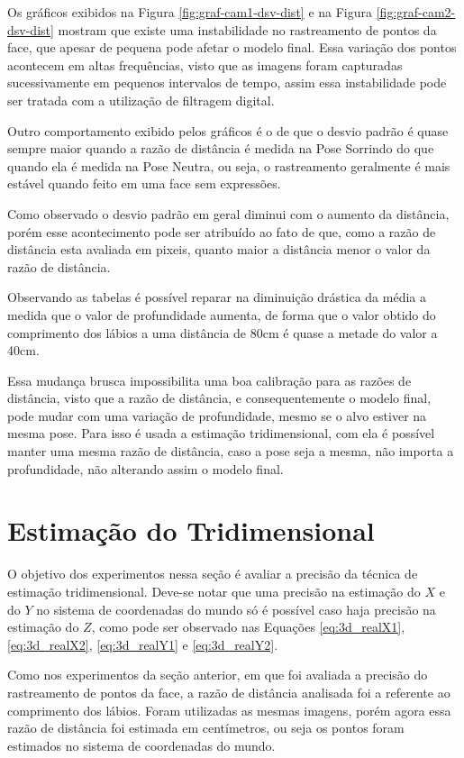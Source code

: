 Os gráficos exibidos na Figura \ref{fig:graf-cam1-dsv-dist} e na Figura \ref{fig:graf-cam2-dsv-dist} mostram que existe uma instabilidade no rastreamento de pontos da face, que apesar de pequena pode afetar o modelo final. Essa variação dos pontos acontecem em altas frequências, visto que as imagens foram capturadas sucessivamente em pequenos intervalos de tempo, assim essa instabilidade pode ser tratada com a utilização de filtragem digital. 

Outro comportamento exibido pelos gráficos é o de que o desvio padrão é quase sempre maior quando a razão de distância é medida na Pose Sorrindo do que quando ela é medida na Pose Neutra, ou seja, o rastreamento geralmente é mais estável quando feito em uma face sem expressões.

Como observado o desvio padrão em geral diminui com o aumento da distância, porém esse acontecimento pode ser atribuído ao fato de que, como a razão de distância esta avaliada em pixeis, quanto maior a distância menor o valor da razão de distância.

Observando as tabelas é possível reparar na diminuição drástica da média a medida que o valor de profundidade aumenta, de forma que o valor obtido do comprimento dos lábios a uma distância de 80cm é quase a metade do valor a 40cm. 

Essa mudança brusca impossibilita uma boa calibração para as razões de distância, visto que a razão de distância, e consequentemente o modelo final, pode mudar com uma variação de profundidade, mesmo se o alvo estiver na mesma pose. Para isso é usada a estimação tridimensional, com ela é possível manter uma mesma razão de distância, caso a pose seja a mesma, não importa a profundidade, não alterando assim o modelo final.

\section{Estimação do Tridimensional}

O objetivo dos experimentos nessa seção é avaliar a precisão da técnica de estimação tridimensional. Deve-se notar que uma precisão na estimação do $X$ e do $Y$ no sistema de coordenadas do mundo só é possível caso haja precisão na estimação do $Z$, como pode ser observado nas Equações \ref{eq:3d_realX1}, \ref{eq:3d_realX2}, \ref{eq:3d_realY1} e \ref{eq:3d_realY2}.

Como nos experimentos da seção anterior, em que foi avaliada a precisão do rastreamento de pontos da face, a razão de distância analisada foi a referente ao comprimento dos lábios. Foram utilizadas as mesmas imagens, porém agora essa razão de distância foi estimada em centímetros, ou seja os pontos foram estimados no sistema de coordenadas do mundo.

